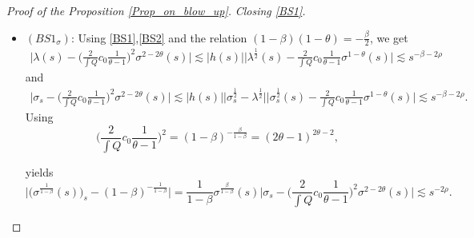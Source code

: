 \documentclass[10pt,a4paper]{amsart}
\begin{document}
\begin{proof}[Proof of the Proposition \ref{Prop_on_blow_up}]
\vspace{0.2cm}
\textit{Closing \eqref{BS1}.} 
\begin{itemize}
    \item $(BS1_{\sigma})$: Using \eqref{BS1},\eqref{BS2} and the relation $(1-\beta)(1-\theta) = -\frac{\beta}{2}$, we get
\begin{equation}\label{lambda_sigma_2_2theta}
    \begin{split}
        \Big\lvert \lambda(s) - \Big( \frac{2}{\int Q}c_0 \frac{1}{\theta -1} \Big)^2 \sigma^{2-2\theta}(s) \Big\rvert \lesssim |h(s)| \Big\lvert \lambda^{\frac{1}{2}}(s) - \frac{2}{\int Q} c_0 \frac{1}{\theta -1} \sigma^{1-\theta}(s)\Big\rvert 
        \lesssim s^{-\beta-2\rho}
    \end{split}
\end{equation}
    and 
\begin{equation}
    \begin{split}
        \Big\lvert \sigma_s - \Big( \frac{2}{\int Q}c_0 \frac{1}{\theta -1} \Big)^2 \sigma^{2-2\theta}(s) \Big\rvert \lesssim |h(s)| \Big| \sigma_s^{\frac{1}{2}} - \lambda^{\frac{1}{2}} \Big| \Big\lvert \sigma_s^{\frac{1}{2}}(s) - \frac{2}{\int Q} c_0 \frac{1}{\theta -1} \sigma^{1-\theta}(s)\Big\rvert 
        \lesssim s^{-\beta-2\rho}.
\end{split}
\end{equation}
Using 
\begin{equation}\label{relation_on_constant_2theta_minus_one}
    \Big( \frac{2}{\int Q} c_0 \frac{1}{\theta -1}\Big)^2 = (1-\beta )^{-\frac{\beta}{1-\beta}} = (2\theta -1)^{2\theta - 2},
\end{equation}

yields
\begin{equation}
    \Big\lvert \big(\sigma^{\frac{1}{1-\beta}}(s)\big)_s - (1-\beta)^{-\frac{1}{1-\beta}} \Big\rvert = \frac{1}{1-\beta} \sigma^{\frac{\beta}{1-\beta}}(s) \Big\lvert \sigma_s - \Big( \frac{2}{\int Q}c_0 \frac{1}{\theta -1} \Big)^2 \sigma^{2-2\theta}(s) \Big\rvert \lesssim s^{-2 \rho}.
\end{equation}



\end{itemize}
\end{proof}
\end{document}
